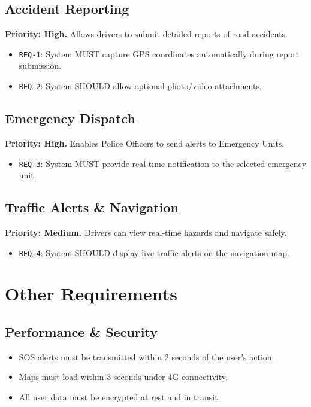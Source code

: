\documentclass[11pt,a4paper]{article}
\begin{document}
\subsection{Accident Reporting}
\textbf{Priority: High.} Allows drivers to submit detailed reports of road accidents.
\begin{itemize}[label=--]
    \item \texttt{REQ-1}: System MUST capture GPS coordinates automatically during report submission.
    \item \texttt{REQ-2}: System SHOULD allow optional photo/video attachments.
\end{itemize}

\subsection{Emergency Dispatch}
\textbf{Priority: High.} Enables Police Officers to send alerts to Emergency Units.
\begin{itemize}[label=--]
    \item \texttt{REQ-3}: System MUST provide real-time notification to the selected emergency unit.
\end{itemize}

\subsection{Traffic Alerts \& Navigation}
\textbf{Priority: Medium.} Drivers can view real-time hazards and navigate safely.
\begin{itemize}[label=--]
    \item \texttt{REQ-4}: System SHOULD display live traffic alerts on the navigation map.
\end{itemize}

\section{Other Requirements}

\subsection{Performance \& Security}
\begin{itemize}
    \item SOS alerts must be transmitted within 2 seconds of the user's action.
    \item Maps must load within 3 seconds under 4G connectivity.
    \item All user data must be encrypted at rest and in transit.
\end{itemize}
\end{document}
